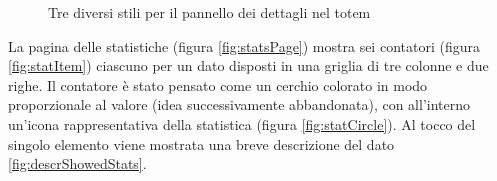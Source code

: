 \begin{figure}
    \centering
    \caption{Tre diversi stili per il pannello dei dettagli nel totem}
    \label{fig:detailBanner}
\end{figure}

La pagina delle statistiche (figura \ref{fig:statsPage}) mostra sei contatori (figura \ref{fig:statItem}) ciascuno per un dato disposti in una griglia di tre colonne e due righe. Il contatore è stato pensato come un cerchio colorato in modo proporzionale al valore (idea successivamente abbandonata), con all'interno un'icona rappresentativa della statistica (figura \ref{fig:statCircle}). Al tocco del singolo elemento viene mostrata una breve descrizione del dato \ref{fig:descrShowedStats}.

